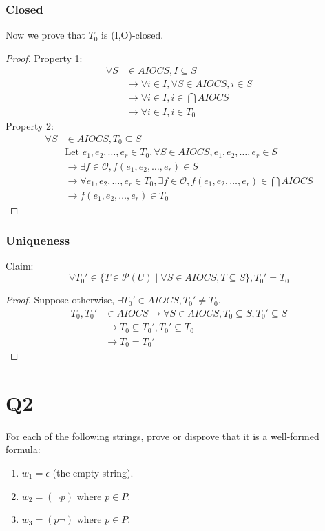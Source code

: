 \documentclass{article}
\begin{document}
\subsubsection*{Closed}
Now we prove that $T_0$ is (I,O)-closed.
\begin{proof}
    Property 1:
    \begin{align*}
        \forall S &\in AIOCS, I \subseteq S \\
        &\rightarrow \forall i \in I, \forall S \in AIOCS, i \in S\\
        &\rightarrow \forall i \in I, i \in \bigcap AIOCS\\
        &\rightarrow \forall i \in I, i \in T_0
    \end{align*}
    Property 2:
    \begin{align*}
        \forall S &\in AIOCS, T_0 \subseteq S\\
        &\text{Let } e_1, e_2, \dots, e_r \in T_0, \forall S \in AIOCS, e_1, e_2, \dots, e_r \in S \\
        &\rightarrow \exists f \in \mathcal{O}, f(e_1, e_2, \dots, e_r) \in S\\
        &\rightarrow \forall e_1, e_2, \dots, e_r \in T_0, \exists f \in \mathcal{O}, f(e_1, e_2, \dots, e_r) \in \bigcap AIOCS\\
        &\rightarrow f(e_1, e_2, \dots, e_r) \in T_0
    \end{align*}
\end{proof}
\subsubsection*{Uniqueness}
Claim: 
\[\forall T_0' \in \{T \in \mathcal{P}(U)\mid \forall S \in AIOCS, T \subseteq S\}, T_0' = T_0\]
\begin{proof}
    Suppose otherwise, $\exists T_0' \in AIOCS, T_0' \neq T_0$. 
    \begin{align*}
        T_0, T_0' &\in AIOCS \rightarrow \forall S \in AIOCS, T_0 \subseteq S, T_0' \subseteq S\\
        &\rightarrow T_0 \subseteq T_0', T_0' \subseteq T_0\\
        &\rightarrow T_0 = T_0'
    \end{align*}
\end{proof}
\section*{Q2}
For each of the following strings, prove or disprove that it is a well-formed formula:
\begin{enumerate}
  \item $w_1 = \epsilon$ (the empty string).
  \item $w_2 = (\neg p)$ where $p \in P$.
  \item $w_3 = (p\neg)$ where $p \in P$.
\end{enumerate}
\end{document}
